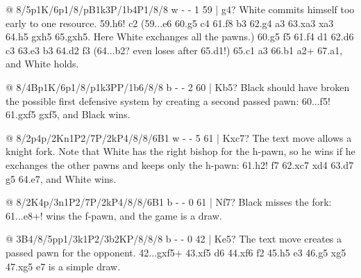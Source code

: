 @ 8/5p1K/6p1/8/pB1k3P/1b4P1/8/8 w - - 1 59 | g4?
White commits himself too early to one resource. 59.\K h6! \B c2 (59...\B e6 60.\K g5 \K c4 61.\B f8 \K b3 62.g4 a3 63.\B xa3 \K xa3 64.h5 gxh5 65.gxh5. Here White exchanges all the pawns.) 60.\K g5 f5 61.\K f4 \B d1 62.\B d6 \K c3 63.\K e3 \K b3 64.\K d2 \B f3 (64...\K b2? even loses after 65.\K d1!) 65.\K c1 a3 66.\K b1 a2+ 67.\K a1, and White holds.

@ 8/4Bp1K/6p1/8/p1k3PP/1b6/8/8 b - - 2 60 | Kb5?
Black should have broken the possible first defensive system by creating a second passed pawn: 60...f5! 61.gxf5 gxf5, and Black wins.

@ 8/2p4p/2Kn1P2/7P/2kP4/8/8/6B1 w - - 5 61 | Kxc7?
The text move allows a knight fork. Note that White has the right bishop for the h-pawn, so he wins if he exchanges the other pawns and keeps only the h-pawn: 61.\B h2! \N f7 62.\B xc7 \K xd4 63.\K d7 \N g5 64.\K e7, and White wins.

@ 8/2K4p/3n1P2/7P/2kP4/8/8/6B1 b - - 0 61 | Nf7?
Black misses the fork: 61...\N e8+! wins the f-pawn, and the game is a draw.

@ 3B4/8/5pp1/3k1P2/3b2KP/8/8/8 b - - 0 42 | Ke5?
The text move creates a passed pawn for the opponent. 42...gxf5+ 43.\K xf5 \K d6 44.\B xf6 \B f2
45.h5 \B e3 46.\B g5 \B xg5 47.\K xg5 \K e7 is a simple draw.
